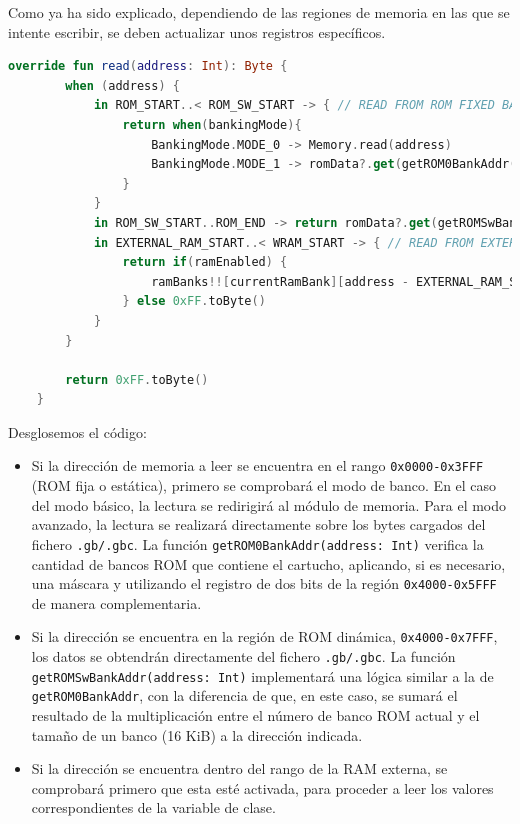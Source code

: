 Como ya ha sido explicado, dependiendo de las regiones de memoria en las que se intente escribir, se deben actualizar unos registros específicos.

\begin{lstlisting}[language=Kotlin, caption={Lectura en regiones ROM.}, label={code:romreadkotlin}]
    override fun read(address: Int): Byte {
        when (address) {
            in ROM_START..< ROM_SW_START -> { // READ FROM ROM FIXED BANK
                return when(bankingMode){
                    BankingMode.MODE_0 -> Memory.read(address)
                    BankingMode.MODE_1 -> romData?.get(getROM0BankAddr(address)) ?: 0xFF.toByte()
                }
            }
            in ROM_SW_START..ROM_END -> return romData?.get(getROMSwBankAddr(address)) ?: 0xFF.toByte() // READ FROM SWITCHABLE ROM BANK
            in EXTERNAL_RAM_START..< WRAM_START -> { // READ FROM EXTERNAL RAM
                return if(ramEnabled) {
                    ramBanks!![currentRamBank][address - EXTERNAL_RAM_START]
                } else 0xFF.toByte()
            }
        }

        return 0xFF.toByte()
    }
\end{lstlisting}

Desglosemos el código:

\begin{itemize}
    \item Si la dirección de memoria a leer se encuentra en el rango \texttt{0x0000-0x3FFF} (ROM fija o estática), primero se comprobará el modo de banco. En el caso del modo básico, la lectura se redirigirá al módulo de memoria. Para el modo avanzado, la lectura se realizará directamente sobre los bytes cargados del fichero \texttt{.gb/.gbc}. La función \texttt{getROM0BankAddr(address: Int)} verifica la cantidad de bancos ROM que contiene el cartucho, aplicando, si es necesario, una máscara y utilizando el registro de dos bits de la región \texttt{0x4000-0x5FFF} de manera complementaria.

    \item Si la dirección se encuentra en la región de ROM dinámica, \texttt{0x4000-0x7FFF}, los datos se obtendrán directamente del fichero \texttt{.gb/.gbc}. La función \texttt{getROMSwBankAddr(address: Int)} implementará una lógica similar a la de \texttt{getROM0BankAddr}, con la diferencia de que, en este caso, se sumará el resultado de la multiplicación entre el número de banco ROM actual y el tamaño de un banco (16 KiB) a la dirección indicada.

    \item Si la dirección se encuentra dentro del rango de la RAM externa, se comprobará primero que esta esté activada, para proceder a leer los valores correspondientes de la variable de clase.
\end{itemize}

